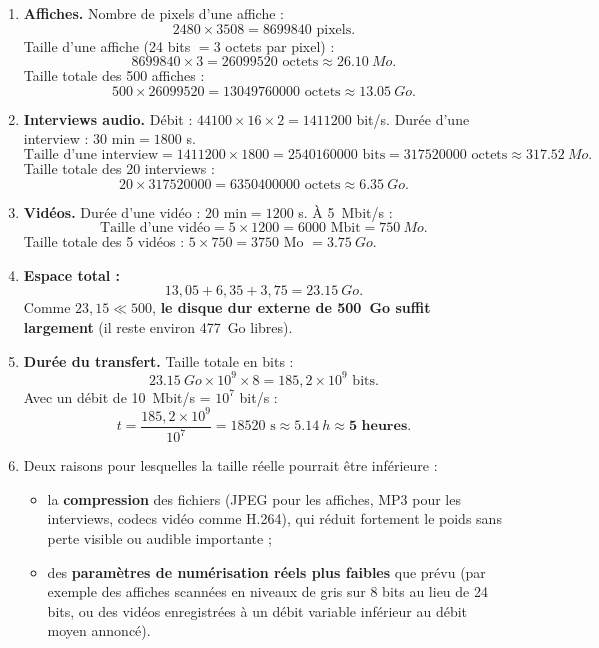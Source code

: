 \documentclass[11pt]{article}
\begin{document}
\begin{corrige}
\begin{enumerate}
\item \textbf{Affiches.} Nombre de pixels d'une affiche :
\[ 2480 \times 3508 = \num{8699840} \text{ pixels.} \]
Taille d'une affiche (24 bits $= 3$ octets par pixel) :
\[ \num{8699840} \times 3 = \num{26099520} \text{ octets} \approx \SI{26,10}{Mo}. \]
Taille totale des 500 affiches :
\[ 500 \times \num{26099520} = \num{13049760000} \text{ octets} \approx \SI{13,05}{Go}. \]
\item \textbf{Interviews audio.} Débit : $\num{44100} \times 16 \times 2 = \num{1411200}$ bit/s. Durée d'une interview : $30 \text{ min} = \num{1800}$ s.
\[ \text{Taille d'une interview} = \num{1411200} \times 1800 = \num{2540160000} \text{ bits} = \num{317520000} \text{ octets} \approx \SI{317,52}{Mo}. \]
Taille totale des 20 interviews :
\[ 20 \times \num{317520000} = \num{6350400000} \text{ octets} \approx \SI{6,35}{Go}. \]
\item \textbf{Vidéos.} Durée d'une vidéo : $20 \text{ min} = \num{1200}$ s. À \SI{5}{Mbit/s} :
\[ \text{Taille d'une vidéo} = 5 \times 1200 = \num{6000} \text{ Mbit} = \SI{750}{Mo}. \]
Taille totale des 5 vidéos : $5 \times 750 = \num{3750}$ Mo $= \SI{3,75}{Go}$.
\item \textbf{Espace total :}
\[ 13,05 + 6,35 + 3,75 = \SI{23,15}{Go}. \]
Comme $23,15 \ll 500$, \textbf{le disque dur externe de \SI{500}{Go} suffit largement} (il reste environ \SI{477}{Go} libres).
\item \textbf{Durée du transfert.} Taille totale en bits :
\[ \SI{23,15}{Go} \times 10^9 \times 8 = 185,2 \times 10^9 \text{ bits.} \]
Avec un débit de \SI{10}{Mbit/s} = $10^7$ bit/s :
\[ t = \frac{185,2 \times 10^9}{10^7} = \num{18520} \text{ s} \approx \SI{5,14}{h} \approx \textbf{5 heures}. \]
\item Deux raisons pour lesquelles la taille réelle pourrait être inférieure :
\begin{itemize}
\item la \textbf{compression} des fichiers (JPEG pour les affiches, MP3 pour les interviews, codecs vidéo comme H.264), qui réduit fortement le poids sans perte visible ou audible importante ;
\item des \textbf{paramètres de numérisation réels plus faibles} que prévu (par exemple des affiches scannées en niveaux de gris sur 8 bits au lieu de 24 bits, ou des vidéos enregistrées à un débit variable inférieur au débit moyen annoncé).

\end{itemize}
\end{enumerate}
\end{corrige}
\end{document}
